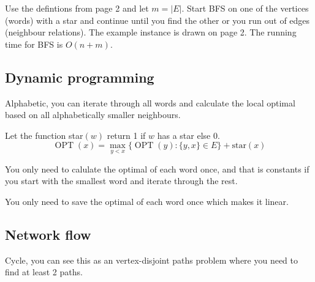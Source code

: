 \documentclass[a4paper]{article}
\newenvironment{task}[1]
{
	\begin{description}[align=right]
		\item [#1]
}{		%
	\end{description}
}
\newcommand{\abs}[1]{\left|#1\right|}
\DeclareMathOperator{\OPT}{OPT}
\DeclareMathOperator{\*}{\cdot}
\begin{document}
\begin{task}{(c)}
	\qquad Use the defintions from page 2 and let $m=\abs{E}$. Start BFS on one of the vertices (words) with a star and continue until you find the other or you run out of edges (neighbour relations). The example instance is drawn on page 2. The running time for BFS is $O(n+m)$.
\end{task}

\subsection*{Dynamic programming}

\begin{task}{8. (a)}
	 Alphabetic, you can iterate through all words and calculate the local optimal based on all alphabetically smaller neighbours.
\end{task}

\begin{task}{(b)}
	\qquad Let the function star$(w)$ return 1 if $w$ has a star else 0.
	\[\OPT(x)=\max_{y<x}\{\OPT(y):\{y,x\}\in E\}+\text{star}(x)\]
\end{task}

\begin{task}{(c)}
	 You only need to calulate the optimal of each word once, and that is constants if you start with the smallest word and iterate through the rest.
\end{task}

\begin{task}{(d)}
	 You only need to save the optimal of each word once which makes it linear.
\end{task}

\subsection*{Network flow}

\begin{task}{9. (a)}
	 Cycle, you can see this as an vertex-disjoint paths problem where you need to find at least 2 paths.
\end{task}
\end{document}

